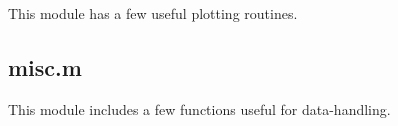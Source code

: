 \documentclass[11pt, twoside,openright]{article}
\begin{document}
This module has a few useful plotting routines.



\subsection{misc.m}\label{sub.misc.m}

This module includes a few functions useful for data-handling.



\newpage

\printbibliography

\newpage

\printindex

%
%
\end{document}
